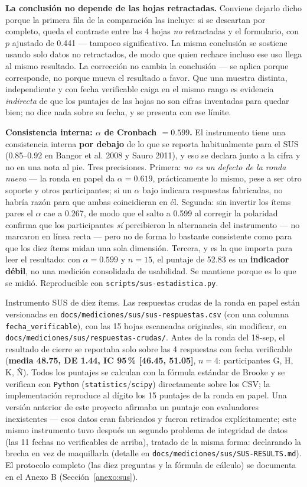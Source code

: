 \textbf{La conclusión no depende de las hojas retractadas.} Conviene dejarlo dicho porque la primera
fila de la comparación las incluye: si se descartan por completo, queda el contraste entre las 4 hojas
\emph{no} retractadas y el formulario, con $p$ ajustado de 0.441 --- tampoco significativo. La misma
conclusión se sostiene usando solo datos no retractados, de modo que quien rechace incluso ese uso
llega al mismo resultado. La corrección no cambia la conclusión --- se
aplica porque corresponde, no porque mueva el resultado a favor. Que una muestra distinta,
independiente y con fecha verificable caiga en el mismo rango es evidencia \emph{indirecta} de que los
puntajes de las hojas no son cifras inventadas para quedar bien; no dice nada sobre su fecha, y se
presenta con ese límite.

\textbf{Consistencia interna: $\alpha$ de Cronbach $= 0.599$.} El instrumento tiene una consistencia
interna \textbf{por debajo} de lo que se reporta habitualmente para el SUS (0.85--0.92 en Bangor et al.
2008 y Sauro 2011), y eso se declara junto a la cifra y no en una nota al pie. Tres precisiones. Primera:
\emph{no es un defecto de la ronda nueva} --- la ronda en papel da $\alpha = 0.619$, prácticamente lo
mismo, pese a ser otro soporte y otros participantes; si un $\alpha$ bajo indicara respuestas
fabricadas, no habría razón para que ambas coincidieran en él. Segunda: sin invertir los ítems pares el
$\alpha$ cae a 0.267, de modo que el salto a 0.599 al corregir la polaridad confirma que los
participantes \emph{sí} percibieron la alternancia del instrumento --- no marcaron en línea recta ---
pero no de forma lo bastante consistente como para que los diez ítems midan una sola dimensión.
Tercera, y es la que importa para leer el resultado: con $\alpha = 0.599$ y $n = 15$, el puntaje de
52.83 es un \textbf{indicador débil}, no una medición consolidada de usabilidad. Se mantiene porque es
lo que se midió. Reproducible con \texttt{scripts/sus-estadistica.py}.

Instrumento SUS de diez ítems. Las respuestas crudas de la ronda en papel están versionadas en
\texttt{docs/mediciones/sus/sus-respuestas.csv} (con una columna \texttt{fecha\_verificable}), con las 15
hojas escaneadas originales, sin modificar, en \texttt{docs/mediciones/sus/respuestas-crudas/}. Antes de
la ronda del 18-sep, el resultado de cierre se reportaba solo sobre las 4 respuestas con fecha
verificable (\textbf{media 48.75, DE 1.44, IC 95\,\% [46.45, 51.05]}, $n=4$: participantes G, H, K, Ñ).
Todos los puntajes se calculan con la fórmula estándar de Brooke y se verifican con \texttt{Python}
(\texttt{statistics}/\texttt{scipy}) directamente sobre los CSV; la implementación reproduce al dígito
los 15 puntajes de la ronda en papel. Una
versión anterior de este proyecto afirmaba un puntaje con evaluadores inexistentes --- esos datos eran
fabricados y fueron retirados explícitamente; este mismo instrumento tuvo después un segundo problema de
integridad de datos (las 11 fechas no verificables de arriba), tratado de la misma forma: declarando la
brecha en vez de maquillarla (detalle en \texttt{docs/mediciones/sus/SUS-RESULTS.md}). El protocolo
completo (las diez preguntas y la fórmula de cálculo) se documenta en el Anexo B (Sección~\ref{anexo:sus}).

